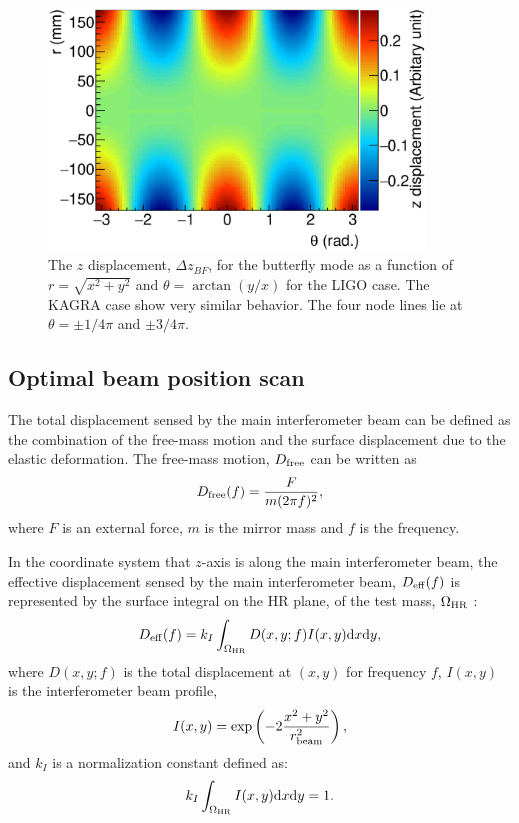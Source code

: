 \begin{figure}
\begin{center}
\includegraphics[width=10cm]{Figures/fem-bfly.eps}
\caption{The $z$ displacement, $\Delta z_{BF}$, for the butterfly mode 
as a function of $r=\sqrt{x^2+y^2}$ and $\theta=\arctan(y/x)$
for the LIGO case. The KAGRA case show very similar behavior.
The four node lines lie at $\theta=\pm1/4\pi$ and $\pm3/4\pi$.}
\label{fig:fem-bfly}
\end{center}
\end{figure}

\subsection{Optimal beam position scan} \label{fem-opt}

The total displacement sensed by the main interferometer beam can be 
defined as the combination of the free-mass motion and the surface 
displacement due to the elastic deformation. The free-mass motion, 
$D_{\rm free}$ 
can be written as
\begin{equation}
D_{\rm free}(f) = \frac{F}{m(2\pi f)^2},
\end{equation}
where $F$ is an external force, $m$ is the mirror mass and 
$f$ is the frequency.

In the coordinate system that $z$-axis is along the main interferometer 
beam, the effective displacement sensed by the main interferometer beam,
$D_{\rm eff}(f)$ is represented by the surface integral on the HR plane, 
of the test mass, $\Omega_{\rm HR}$ :
\begin{equation}
D_{\rm eff}(f) = k_{I}\int_{\Omega_{\rm HR}}D(x,y;f)I(x,y){\rm d}x{\rm d}y,
\end{equation}
where $D(x,y;f)$ is the total displacement at $(x,y)$ for frequency $f$, 
$I(x,y)$ is the interferometer beam profile, 
\begin{equation}
I(x,y) = \exp\left(-2\frac{x^2+y^2}{r_{\rm beam}^2}\right),
\end{equation}
and $k_{I}$ is a normalization constant defined as:
\begin{equation}
k_{I}\int_{\Omega_{\rm HR}}I(x,y){\rm d}x{\rm d}y = 1.
\end{equation}


